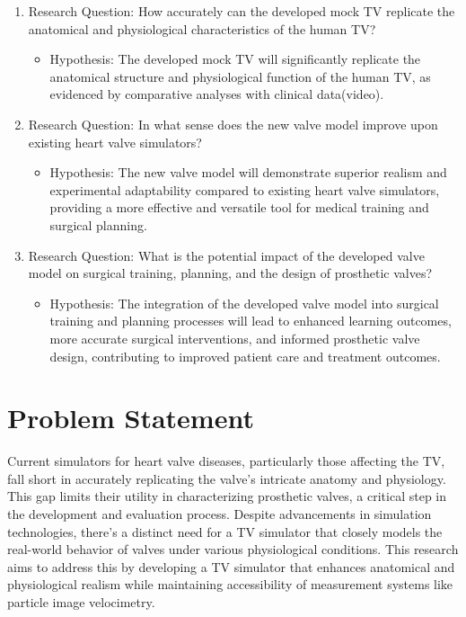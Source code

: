 \begin{enumerate}
    \item Research Question: How accurately can the developed mock \gls{TV} replicate the anatomical and physiological characteristics of the human \gls{TV}?
          \begin{itemize}
              \item Hypothesis: The developed mock \gls{TV} will significantly replicate the anatomical structure and physiological function of the human \gls{TV}, as evidenced by comparative analyses with clinical data(video).
          \end{itemize}

    \item Research Question: In what sense does the new valve model improve upon existing heart valve simulators?
          \begin{itemize}
              \item Hypothesis: The new valve model will demonstrate superior realism and experimental adaptability compared to existing heart valve simulators, providing a more effective and versatile tool for medical training and surgical planning.
          \end{itemize}

    \item Research Question: What is the potential impact of the developed valve model on surgical training, planning, and the design of prosthetic valves?
          \begin{itemize}
              \item Hypothesis: The integration of the developed valve model into surgical training and planning processes will lead to enhanced learning outcomes, more accurate surgical interventions, and informed prosthetic valve design, contributing to improved patient care and treatment outcomes.
          \end{itemize}
\end{enumerate}

\section{Problem Statement}
Current simulators for heart valve diseases, particularly those affecting the \gls{TV}, fall short in accurately replicating the valve's intricate anatomy and physiology. This gap limits their utility in characterizing prosthetic valves, a critical step in the development and evaluation process. Despite advancements in simulation technologies, there's a distinct need for a \gls{TV} simulator that closely models the real-world behavior of valves under various physiological conditions. This research aims to address this by developing a \gls{TV} simulator that enhances anatomical and physiological realism while maintaining accessibility of measurement systems like particle image velocimetry.

